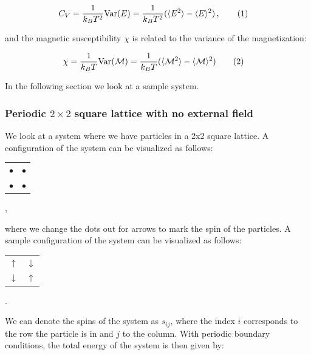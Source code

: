 \documentclass[reprint,english,notitlepage]{revtex4-1}  %
\newcommand\numberthis{\addtocounter{equation}{1}\tag{\theequation}}
\begin{document}
\begin{align*}
C_V &= \frac{1}{k_B T^2} \text{Var}(E) = \frac{1}{k_B T^2} (\langle E^2 \rangle - \langle E \rangle^2) \, ,\numberthis \label{eq:heat_capacity}
\end{align*}

and the magnetic susceptibility $\chi$ is related to the variance of the magnetization:

\begin{align*}
\chi &= \frac{1}{k_B T} \text{Var}(\mathcal{M}) = \frac{1}{k_B T} ( \langle \mathcal{M}^2 \rangle - \langle \mathcal{M} \rangle^2) \numberthis \label{eq:magnetic_susceptibility}
\end{align*}

In the following section we look at a sample system.


\subsubsection{Periodic \( 2 \times 2 \) square lattice with no external field}

We look at a system where we have particles in a 2x2 square lattice. A configuration of the system can be visualized as follows: \newline

\begin{center}
\begin{tabular}{cc}
$\bullet$ & $\bullet$ \\
$\bullet$ & $\bullet$
\end{tabular}  , \newline
\end{center}

where we change the dots out for arrows to mark the spin of the particles. A sample configuration of the system can be visualized as follows: \newline

\begin{center}
\begin{tabular}{cc}
$\uparrow$ & $\downarrow$ \\
$\downarrow$ & $\uparrow$
\end{tabular}  . \newline
\end{center}


We can denote the spins of the system as $s_{ij}$, where the index $i$ corresponds to the row the particle is in and $j$ to the column. With periodic boundary conditions, the total energy of the system is then given by:
\end{document}

